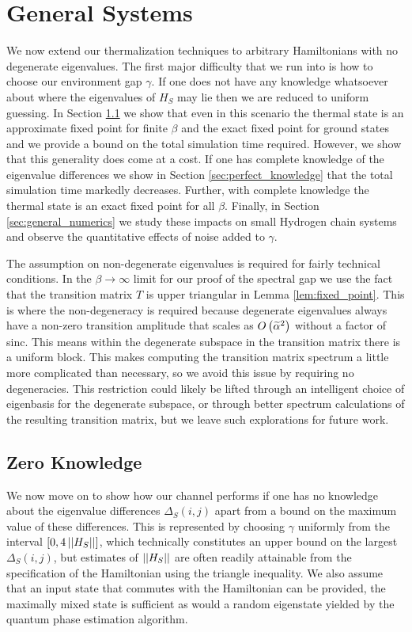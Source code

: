\section{General Systems} \label{sec:general_systems}

We now extend our thermalization techniques to arbitrary Hamiltonians with no degenerate eigenvalues. The first major difficulty that we run into is how to choose our environment gap $\gamma$. If one does not have any knowledge whatsoever about where the eigenvalues of $H_S$ may lie then we are reduced to uniform guessing. In Section \ref{sec:zero_knowledge} we show that even in this scenario the thermal state is an approximate fixed point for finite $\beta$ and the exact fixed point for ground states and we provide a bound on the total simulation time required. However, we show that this generality does come at a cost. If one has complete knowledge of the eigenvalue differences we show in Section \ref{sec:perfect_knowledge} that the total simulation time markedly decreases. Further, with complete knowledge the thermal state is an exact fixed point for all $\beta$. Finally, in Section \ref{sec:general_numerics} we study these impacts on small Hydrogen chain systems and observe the quantitative effects of noise added to $\gamma$. 

The assumption on non-degenerate eigenvalues is required for fairly technical conditions. In the $\beta \to \infty$ limit for our proof of the spectral gap we use the fact that the transition matrix $T$ is upper triangular in Lemma \ref{lem:fixed_point}. This is where the non-degeneracy is required because degenerate eigenvalues always have a non-zero transition amplitude that scales as $O\left( \widetilde{\alpha}^2 \right)$ without a factor of sinc. This means within the degenerate subspace in the transition matrix there is a uniform block. This makes computing the transition matrix spectrum a little more complicated than necessary, so we avoid this issue by requiring no degeneracies. This restriction could likely be lifted through an intelligent choice of eigenbasis for the degenerate subspace, or through better spectrum calculations of the resulting transition matrix, but we leave such explorations for future work. 



\subsection{Zero Knowledge} \label{sec:zero_knowledge}
We now move on to show how our channel performs if one has no knowledge about the eigenvalue differences $\Delta_S(i,j)$ apart from a bound on the maximum value of these differences. This is represented by choosing $\gamma$ uniformly from the interval $[0, 4 \left| \left| H_S \right| \right|]$, which technically constitutes an upper bound on the largest $\Delta_S(i,j)$, but estimates of $\left| \left| H_S \right| \right|$ are often readily attainable from the specification of the Hamiltonian using the triangle inequality.  We also assume that an input state that commutes with the Hamiltonian can be provided, the maximally mixed state is sufficient as would a random eigenstate yielded by the quantum phase estimation algorithm.

